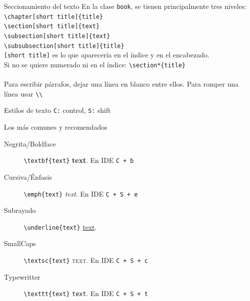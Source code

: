 \documentclass[12pt]{beamer}
\begin{document}
\begin{frame}[fragile]{Seccionamiento del texto}
	En la clase \texttt{book}, se tienen principalmente tres niveles:\\
	\verb|\chapter[short title]{title}| \\
	\verb|\section[short title]{text}|\\
	\verb|\subsection[short title]{text}|\\
	\verb|\subsubsection[short title]{title}|\\
	
	\texttt{[short title]} es lo que aparecería en el índice y en el encabezado. \\ 
	
	Si no se quiere numerado ni en el índice: \verb|\section*{title}|\\
	\hrulefill\\
	Para escribir párrafos, dejar una línea en blanco entre ellos. Para romper una línea usar \verb|\\|
\end{frame}

\begin{frame}[fragile]{Estilos de texto}
	\texttt{C:} control, \texttt{S:} shift
	\begin{block}{Los más comunes y recomendados}
		\begin{description}
			\item[Negrita/Boldface] \verb|\textbf{text}| \textbf{text}. En IDE \texttt{C + b}
			\item[Cursiva/Énfasis] \verb|\emph{text}| \emph{text}. En IDE \texttt{C + S + e}
			\item[Subrayado] \verb|\underline{text}| \underline{text}.
			\item[SmallCaps] \verb|\textsc{text}| \textsc{text}. En IDE \texttt{C + S + c}
			\item[Typewritter] \verb|\texttt{text}| \texttt{text}. En IDE \texttt{C + S + t}
		\end{description}
	\end{block}
\end{frame}
\end{document}
